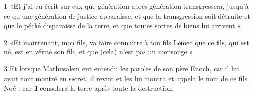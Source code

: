 
\par 1 «Et j'ai vu écrit sur eux que génération après génération transgressera, jusqu'à ce qu'une génération de justice apparaisse, et que la transgression soit détruite et que le péché disparaisse de la terre, et que toutes sortes de biens lui arrivent.»
\par 2 «Et maintenant, mon fils, va faire connaître à ton fils Lémec que ce fils, qui est né, est en vérité son fils, et que (cela) n'est pas un mensonge.»
\par 3 Et lorsque Mathusalem eut entendu les paroles de son père Enoch, car il lui avait tout montré en secret, il revint et les lui montra et appela le nom de ce fils Noé ; car il consolera la terre après toute la destruction.


